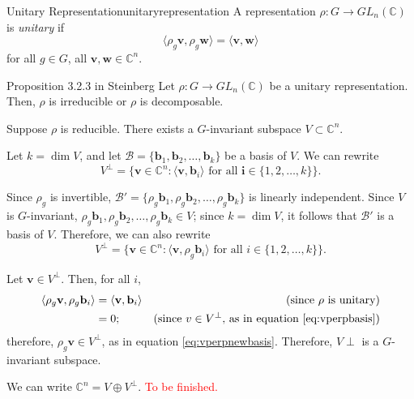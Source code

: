 
\begin{defn}{Unitary Representation}{unitaryrepresentation}
	A representation \(\rho \colon G \to GL_n(\mathbb{C})\) is \emph{unitary} if \[
		\langle \rho_g \mathbf{v}, \rho_g \mathbf{w} \rangle = \langle \mathbf{v}, \mathbf{w} \rangle
	\] for all \(g \in G\), all \(\mathbf{v}, \mathbf{w} \in \mathbb{C}^n\).
\end{defn}

\begin{prop}{Proposition 3.2.3 in Steinberg}{}
	Let \(\rho\colon G \to GL_n(\mathbb{C})\) be a unitary representation.
	Then, \(\rho\) is irreducible or \(\rho\) is decomposable.
\end{prop}

\begin{dem}{}{}
	Suppose \(\rho\) is reducible.
	There exists a \(G\)-invariant subspace \(V \subset \mathbb{C}^n\).

	Let \(k = \dim V\), and let \(\mathcal{B} = \{\mathbf{b}_1, \mathbf{b}_2, \dots, \mathbf{b}_k\}\) be a basis of \(V\).
	We can rewrite
	\begin{equation} \label{eq:vperpbasis}
		V^\perp = \{\mathbf{v} \in \mathbb{C}^n : \langle \mathbf{v}, \mathbf{b}_i \rangle \text{ for all } \mathbf{i} \in \{1, 2, \dots, k\}\}.
	\end{equation}

	Since \(\rho_g\) is invertible, \(\mathcal{B}' = \{\rho_g\mathbf{b}_1, \rho_g\mathbf{b}_2, \dots, \rho_g\mathbf{b}_k\}\) is linearly independent.
	Since \(V\) is \(G\)-invariant, \(\rho_g\mathbf{b}_1,\allowbreak \rho_g\mathbf{b}_2,\allowbreak \dots,\allowbreak \rho_g\mathbf{b}_k \in V\); since \(k = \dim V\), it follows that \(\mathcal{B}'\) is a basis of \(V\).
	Therefore, we can also rewrite
	\begin{equation} \label{eq:vperpnewbasis}
		V^\perp = \{\mathbf{v} \in \mathbb{C}^n : \langle \mathbf{v}, \rho_g\mathbf{b}_i \rangle \text{ for all } i \in \{1, 2, \dots, k\}\}.
	\end{equation}

	Let \(\mathbf{v} \in V^\perp\). Then, for all \(i\),
	\begin{align*}
		\langle \rho_g \mathbf{v}, \rho_g \mathbf{b}_i \rangle &= \langle \mathbf{v}, \mathbf{b}_i \rangle & (\text{since \(\rho\) is unitary})\\
															   &= 0; & (\text{since \(v \in V^\perp\), as in equation \ref{eq:vperpbasis}})
	\end{align*}
	therefore, \(\rho_g \mathbf{v} \in V^\perp\), as in equation \ref{eq:vperpnewbasis}. Therefore, \(V\perp\) is a \(G\)-invariant subspace.

	We can write \(\mathbb{C}^n = V \oplus V^\perp\). \textcolor{red}{To be finished.}
\end{dem}
